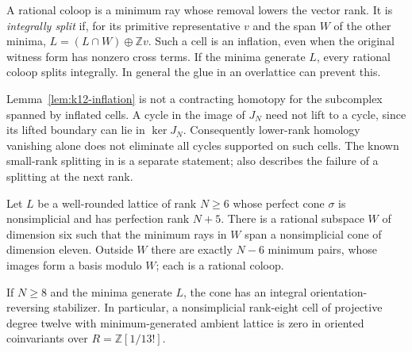 A rational coloop is a minimum ray whose removal lowers the vector
rank. It is \emph{integrally split} if, for its primitive representative
$v$ and the span $W$ of the other minima,
$L=(L\cap W)\oplus\mathbb Zv$. Such a cell is an inflation, even when
the original witness form has nonzero cross terms. If the minima
generate $L$, every rational coloop splits integrally. In general the
glue in an overlattice can prevent this.

Lemma~\ref{lem:k12-inflation} is not a contracting homotopy for the
subcomplex spanned by inflated cells. A cycle in the image of $J_N$
need not lift to a cycle, since its lifted boundary can lie in
$\ker J_N$. Consequently lower-rank homology vanishing alone does not
eliminate all cycles supported on such cells. The known small-rank
splitting in \cite[Theorem~6.1]{ElbazGanglSoule2013} is a separate
statement; \cite[\S6.3]{ElbazGanglSoule2013} also describes the failure
of a splitting at the next rank.

\begin{proposition}[K17-K12-EXCESS5]
\label{prop:k12-excess-five}
Let $L$ be a well-rounded lattice of rank $N\geq6$ whose perfect cone
$\sigma$ is nonsimplicial and has perfection rank $N+5$.
There is a rational subspace $W$ of dimension six such that the
minimum rays in $W$ span a nonsimplicial cone of dimension eleven.
Outside $W$ there are exactly $N-6$ minimum pairs, whose images form
a basis modulo $W$; each is a rational coloop.

If $N\geq8$ and the minima generate $L$, the cone has an integral
orientation-reversing stabilizer. In particular, a nonsimplicial
rank-eight cell of projective degree twelve with minimum-generated
ambient lattice is zero in oriented coinvariants over
$R=\mathbb Z[1/13!]$.
\end{proposition}

